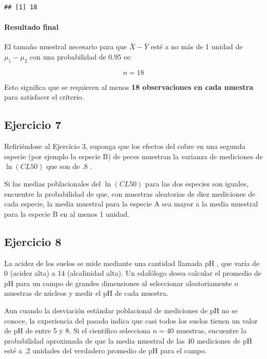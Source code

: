 \documentclass[
]{article}
\begin{document}
\begin{verbatim}
## [1] 18
\end{verbatim}

\paragraph{Resultado final}\label{resultado-final-1}

El tamaño muestral necesario para que \(\bar{X} - \bar{Y}\) esté a no más de 1 unidad de \(\mu_1 - \mu_2\) con una probabilidad de 0.95 es:

\[
n = 18
\]

Esto significa que se requieren al menos \textbf{18 observaciones en cada muestra} para satisfacer el criterio.

\subsection{Ejercicio 7}\label{ejercicio-7-1}

Refiriéndose al Ejercicio 3, suponga que los efectos del cobre en una segunda especie (por ejemplo la especie B) de peces muestran la varianza de mediciones de \(\ln(CL50)\) que son de .8 .

Si las medias poblacionales del \(\ln(CL50)\) para las dos especies son iguales, encuentre la probabilidad de que, con muestras aleatorias de diez mediciones de cada especie, la media muestral para la especie A sea mayor a la media muestral para la especie B en al menos 1 unidad.

\subsection{Ejercicio 8}\label{ejercicio-8-1}

La acidez de los suelos se mide mediante una cantidad llamada pH , que varía de 0 (acidez alta) a 14 (alcalinidad alta). Un edafólogo desea calcular el promedio de pH para un campo de grandes dimensiones al seleccionar aleatoriamente \(n\) muestras de núcleos y medir el pH de cada muestra.

Aun cuando la desviación estándar poblacional de mediciones de pH no se conoce, la experiencia del pasado indica que casi todos los suelos tienen un valor de pH de entre 5 y 8. Si el científico selecciona \(n=40\) muestras, encuentre la probabilidad aproximada de que la media muestral de las 40 mediciones de pH esté a .2 unidades del verdadero promedio de pH para el campo.
\end{document}
